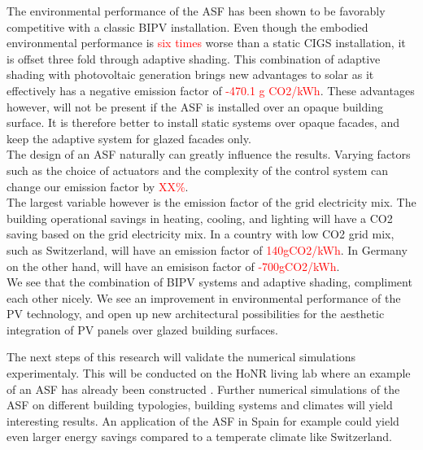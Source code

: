 
The environmental performance of the ASF has been shown to be favorably competitive with a classic BIPV installation. Even though the embodied environmental performance is \textcolor{red}{six times} worse than a static CIGS installation, it is offset three fold through adaptive shading. This combination of adaptive shading with photovoltaic generation brings new advantages to solar as it effectively has a negative emission factor of \textcolor{red}{-470.1 g CO2/kWh}. These advantages however, will not be present if the ASF is installed over an opaque building surface. It is therefore better to install static systems over opaque facades, and keep the adaptive system for glazed facades only. \\

The design of an ASF naturally can greatly influence the results. Varying factors such as the choice of actuators and the complexity of the control system can change our emission factor by \textcolor{red}{XX\%}.\\
The largest variable however is the emission factor of the grid electricity mix. The building operational savings in heating, cooling, and lighting will have a CO2 saving based on the grid electricity mix. In a country with low CO2 grid mix, such as Switzerland, will have an emission factor of \textcolor{red}{140gCO2/kWh}. In Germany on the other hand, will have an emisison factor of \textcolor{red}{-700gCO2/kWh}.\\

We see that the combination of BIPV systems and adaptive shading, compliment each other nicely. We see an improvement in environmental performance of the PV technology, and open up new architectural possibilities for the aesthetic integration of PV panels over glazed building surfaces. 

The next steps of this research will validate the numerical simulations experimentaly. This will be conducted on the HoNR living lab where an example of an ASF has already been constructed \cite{nagy2015frontiers}. Further numerical simulations of the ASF on different building typologies, building systems and climates will yield interesting results. An application of the ASF in Spain for example could yield even larger energy savings compared to a temperate climate like Switzerland.



